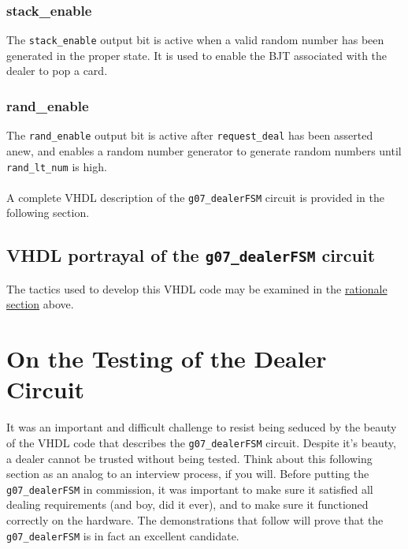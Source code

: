 \documentclass[12pt]{report}
\begin{document}
\subsection*{stack\_enable}
The \texttt{stack\_enable} output bit is active when a valid random number has been generated in the
proper state. It is used to enable the BJT associated with the dealer to pop a card.
\subsection*{rand\_enable}
The \texttt{rand\_enable} output bit is active after \texttt{request\_deal} has been asserted anew,
and enables a random number generator to generate random numbers until \texttt{rand\_lt\_num} is
high.\\\\

A complete VHDL description of the \texttt{g07\_dealerFSM} circuit is provided in the following
section.

\section*{VHDL portrayal of the \texttt{g07\_dealerFSM} circuit}
\label{s:vhdl}
The tactics used to develop this VHDL code may be examined in the \hyperref[s:intro1]{rationale
section} above.


\chapter*{On the Testing of the Dealer Circuit}
It was an important and difficult challenge to resist being seduced by the beauty of the VHDL code
that describes the \texttt{g07\_dealerFSM} circuit. Despite it's beauty, a dealer cannot be trusted
without being tested. Think about this following section as an analog to an interview process, if
you will. Before putting the \texttt{g07\_dealerFSM} in commission, it was important to make sure it
satisfied all dealing requirements (and boy, did it ever), and to make sure it functioned correctly
on the hardware. The demonstrations that follow will prove that the \texttt{g07\_dealerFSM} is in
fact an excellent candidate.
\end{document}
